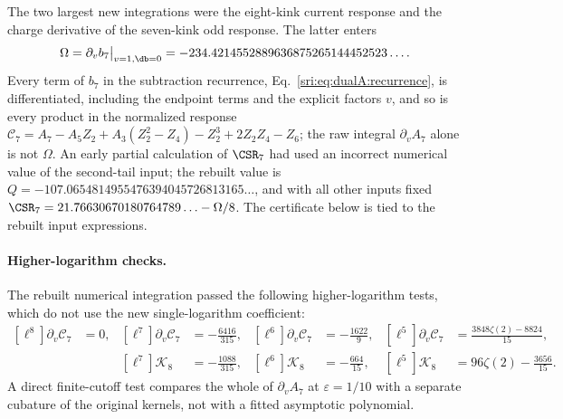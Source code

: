The two largest new integrations were the eight-kink current response and the charge derivative of the seven-kink odd
response. The latter enters
\begin{equation}
 \Omega=\partial_vb_7\big|_{v=1,\db=0}=-234.4214552889636875265144452523\ldots .
\end{equation}
Every term of $b_7$ in the subtraction recurrence, Eq.~\eqref{sri:eq:dualA:recurrence}, is differentiated, including the
endpoint terms and the explicit factors $v$, and so is every product in the normalized response
$\mathcal C_7=A_7-A_5Z_2+A_3(Z_2^2-Z_4)-Z_2^3+2Z_2Z_4-Z_6$; the raw integral $\partial_vA_7$ alone is not $\Omega$.
An early partial calculation of $\CSR_7$ had used an incorrect numerical value of the second-tail input; the rebuilt
value is $Q=-107.0654814955476394045726813165\ldots$, and with all other inputs fixed
$\CSR_7=21.76630670180764789\ldots-\Omega/8$. The certificate below is tied to the rebuilt input expressions.

\paragraph{Higher-logarithm checks.} The rebuilt numerical integration passed the following higher-logarithm tests,
which do not use the new single-logarithm coefficient:
\begin{equation}
\begin{aligned}
 [\ell^8]\partial_v\mathcal C_7&=0, & [\ell^7]\partial_v\mathcal C_7&=-\frac{6416}{315}, &
 [\ell^6]\partial_v\mathcal C_7&=-\frac{1622}{9}, & [\ell^5]\partial_v\mathcal C_7&=\frac{3848\zeta(2)-8824}{15},\\
 && [\ell^7]\mathcal K_8&=-\frac{1088}{315}, & [\ell^6]\mathcal K_8&=-\frac{664}{15}, &
 [\ell^5]\mathcal K_8&=96\zeta(2)-\frac{3656}{15}.
\end{aligned}
\end{equation}
A direct finite-cutoff test compares the whole of $\partial_vA_7$ at $\varepsilon=1/10$ with a separate cubature of the
original kernels, not with a fitted asymptotic polynomial.

